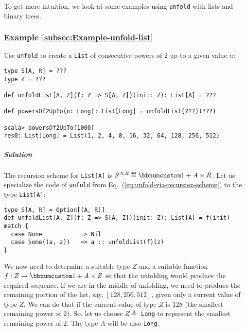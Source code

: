 To get more intuition, we look at some examples using \lstinline!unfold!
with lists and binary trees.

\subsubsection{Example \label{subsec:Example-unfold-list}\ref{subsec:Example-unfold-list}}

Use \lstinline!unfold! to create a \lstinline!List! of consecutive
powers of $2$ up to a given value $n$: 
\begin{lstlisting}
type S[A, R] = ???
type Z = ???

def unfoldList[A, Z](f: Z => S[A, Z])(init: Z): List[A] = ???

def powersOf2UpTo(n: Long): List[Long] = unfoldList(???)(???)

scala> powersOf2UpTo(1000)
res0: List[Long] = List(1, 2, 4, 8, 16, 32, 64, 128, 256, 512)
\end{lstlisting}


\subparagraph{Solution}

The recursion scheme for \lstinline!List[A]! is $S^{A,R}\triangleq\bbnum 1+A\times R$.
Let us specialize the code of \lstinline!unfold! from Eq.~(\ref{eq:unfold-via-recursion-scheme})
to the type \lstinline!List[A]!:
\begin{lstlisting}
type S[A, R] = Option[(A, R)]
def unfoldList[A, Z](f: Z => S[A, Z])(init: Z): List[A] = f(init) match {
  case None           => Nil
  case Some((a, z))   => a :: unfoldList(f)(z)
}
\end{lstlisting}

We now need to determine a suitable type $Z$ and a suitable function
$f:Z\rightarrow\bbnum 1+A\times Z$ so that the unfolding would produce
the required sequence. If we are in the middle of unfolding, we need
to produce the remaining portion of the list, say, $\left[128,256,512\right]$,
given only a current value of type $Z$. We can do that if the current
value of type $Z$ is $128$ (the smallest remaining power of $2$).
So, let us choose $Z\triangleq$ \lstinline!Long! to represent the
smallest remaining power of $2$. The type $A$ will be also \lstinline!Long!. 

